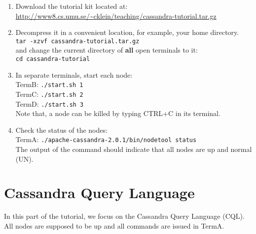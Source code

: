 \documentclass[a4paper,12pt]{article}
\newcommand\code[1]{\texttt{#1}}
\begin{document}
\begin{enumerate}

	\item Download the tutorial kit located at: \\
		\url{http://www8.cs.umu.se/~cklein/teaching/cassandra-tutorial.tar.gz}

	\item Decompress it in a convenient location, for example, your home directory.\\
		\code{tar -xzvf cassandra-tutorial.tar.gz} \\
		and change the current directory of \textbf{all} open terminals to it: \\
		\code{cd cassandra-tutorial}

	\item In separate terminals, start each node:\\
		TermB: \code{./start.sh 1}\\
		TermC: \code{./start.sh 2}\\
		TermD: \code{./start.sh 3}\\
		Note that, a node can be killed by typing CTRL+C in its terminal.

	\item Check the status of the nodes:\\
		TermA: \code{./apache-cassandra-2.0.1/bin/nodetool status} \\
		The output of the command should indicate that all nodes are up and normal (UN).
	
\end{enumerate}

\section{Cassandra Query Language}

In this part of the tutorial, we focus on the Cassandra Query Language (CQL). All nodes are supposed to be up and all commands are issued in TermA.
\end{document}

